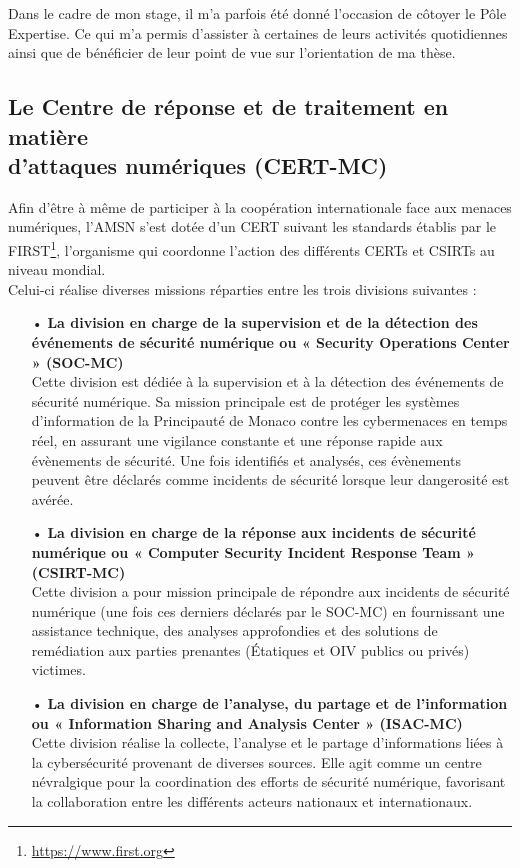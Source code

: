 \vspace{1em}

Dans le cadre de mon stage, il m'a parfois été donné l'occasion de côtoyer le Pôle Expertise. Ce qui m'a permis d'assister à certaines de leurs activités quotidiennes ainsi que de bénéficier de leur point de vue sur l'orientation de ma thèse.

\newpage

\subsection{Le Centre de réponse et de traitement en matière\\ d’attaques numériques (CERT-MC) }

\vspace{1em}

Afin d'être à même  de participer à la coopération internationale face aux menaces numériques, l'AMSN s'est dotée d'un CERT suivant les standards établis par le FIRST\footnote{\url{https://www.first.org}}, l'organisme qui coordonne l'action des différents CERTs et CSIRTs au niveau mondial.\\

Celui-ci réalise diverses missions réparties entre les trois divisions suivantes :\\

\begin{itemize}[itemsep=1em]
    \item[•] \textbf{La division en charge de la supervision et de la détection des événements de sécurité numérique ou « Security Operations Center » (SOC-MC)}\\
    Cette division est dédiée à la supervision et à la détection des événements de sécurité numérique. Sa mission principale est de protéger les systèmes d'information de la Principauté de Monaco contre les cybermenaces en temps réel, en assurant une vigilance constante et une réponse rapide aux évènements de sécurité. Une fois identifiés et analysés, ces évènements peuvent être déclarés comme incidents de sécurité lorsque leur dangerosité est avérée.
    \item[•] \textbf{La division en charge de la réponse aux incidents de sécurité numérique ou « Computer Security Incident Response Team » (CSIRT-MC)}\\
    Cette division a pour mission principale de répondre aux incidents de sécurité numérique (une fois ces derniers déclarés par le SOC-MC) en fournissant une assistance technique, des analyses approfondies et des solutions de remédiation aux parties prenantes (Étatiques et OIV publics ou privés) victimes.
    \item[•] \textbf{La division en charge de l’analyse, du partage et de l’information ou 
    « Information Sharing and Analysis Center » (ISAC-MC)}\\
    Cette division réalise la collecte, l'analyse et le partage d'informations liées à la cybersécurité provenant de diverses sources. Elle agit comme un centre névralgique pour la coordination des efforts de sécurité numérique, favorisant la collaboration entre les différents acteurs nationaux et internationaux.\\
\end{itemize}

